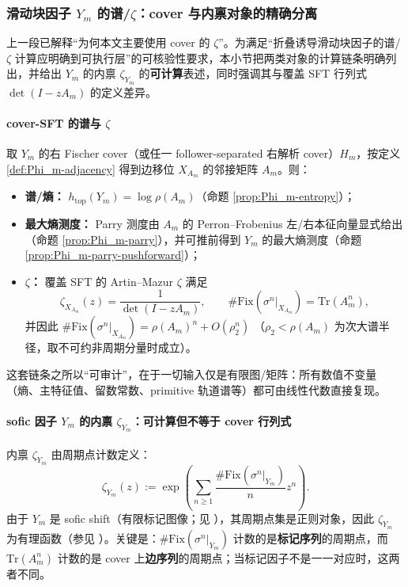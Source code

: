 \subsubsection{滑动块因子 \texorpdfstring{$Y_m$}{Ym} 的谱/\texorpdfstring{$\zeta$}{zeta}：cover 与内禀对象的精确分离}\label{subsec:Ym-zeta-spectrum}
上一段已解释“为何本文主要使用 cover 的 \(\zeta\)”。为满足“折叠诱导滑动块因子的谱/\(\zeta\) 计算应明确到可执行层”的可核验性要求，本小节把两类对象的计算链条明确列出，并给出 \(Y_m\) 的内禀 \(\zeta_{Y_m}\) 的\textbf{可计算}表述，同时强调其与覆盖 SFT 行列式 \(\det(I-zA_m)\) 的定义差异。

\paragraph{cover-SFT 的谱与 \texorpdfstring{$\zeta$}{zeta}}
取 \(Y_m\) 的右 Fischer cover（或任一 follower-separated 右解析 cover）\(H_m\)，按定义 \ref{def:Phi_m-adjacency} 得到边移位 \(X_{A_m}\) 的邻接矩阵 \(A_m\)。则：
\begin{itemize}
  \item \textbf{谱/熵：} \(h_{\mathrm{top}}(Y_m)=\log\rho(A_m)\)（命题 \ref{prop:Phi_m-entropy}）；
  \item \textbf{最大熵测度：} Parry 测度由 \(A_m\) 的 Perron--Frobenius 左/右本征向量显式给出（命题 \ref{prop:Phi_m-parry}），并可推前得到 \(Y_m\) 的最大熵测度（命题 \ref{prop:Phi_m-parry-pushforward}）；
  \item \textbf{\(\zeta\)：} 覆盖 SFT 的 Artin--Mazur \(\zeta\) 满足
  \[
  \zeta_{X_{A_m}}(z)=\frac{1}{\det(I-zA_m)},
  \qquad
  \#\mathrm{Fix}(\sigma^n|_{X_{A_m}})=\mathrm{Tr}(A_m^n),
  \]
  并因此
  \(
  \#\mathrm{Fix}(\sigma^n|_{X_{A_m}})=\rho(A_m)^n+O(\rho_2^n)
  \)
  （\(\rho_2<\rho(A_m)\) 为次大谱半径，取不可约非周期分量时成立）。
\end{itemize}
这套链条之所以“可审计”，在于一切输入仅是有限图/矩阵：所有数值不变量（熵、主特征值、留数常数、primitive 轨道谱等）都可由线性代数直接复现。

\paragraph{sofic 因子 \texorpdfstring{$Y_m$}{Ym} 的内禀 \texorpdfstring{$\zeta_{Y_m}$}{zetaYm}：可计算但不等于 cover 行列式}
内禀 \(\zeta_{Y_m}\) 由周期点计数定义：
\[
\zeta_{Y_m}(z):=\exp\left(\sum_{n\ge 1}\frac{\#\mathrm{Fix}(\sigma^n|_{Y_m})}{n}z^n\right).
\]
由于 \(Y_m\) 是 sofic shift（有限标记图像；见 \cite{Weiss1973SFTandSofic,CovenPaul1975SoficSystems,LindMarcus1995,Kitchens1998SymbolicDynamics}），其周期点集是正则对象，因此 \(\zeta_{Y_m}\) 为有理函数（参见 \cite{Manning1971RationalZeta}）。关键是：\(\#\mathrm{Fix}(\sigma^n|_{Y_m})\) 计数的是\textbf{标记序列}的周期点，而 \(\mathrm{Tr}(A_m^n)\) 计数的是 cover 上\textbf{边序列}的周期点；当标记因子不是一一对应时，这两者不同。

